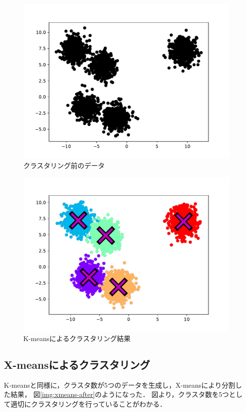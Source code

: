\documentclass[10pt,a4j,twocolumn]{ltjsarticle}
\def\figref#1{図\ref{#1}}
\begin{document}
\begin{figure}[htbp]
  \begin{center}
    \includegraphics[width=0.8\linewidth]{img/k-means/before.pdf}
    \caption{クラスタリング前のデータ}
    \label{img:kmeans-before}
  \end{center}
\end{figure}
\begin{figure}[htbp]
  \begin{center}
    \includegraphics[width=0.8\linewidth]{img/k-means/after.pdf}
    \caption{K-meansによるクラスタリング結果}
    \label{img:kmeans-after}
  \end{center}
\end{figure}

\subsection{X-meansによるクラスタリング}
K-meansと同様に，クラスタ数が5つのデータを生成し，X-meansにより分割した結果，
\figref{img:xmeans-after}のようになった．
図より，クラスタ数を5つとして適切にクラスタリングを行っていることがわかる．
\end{document}
